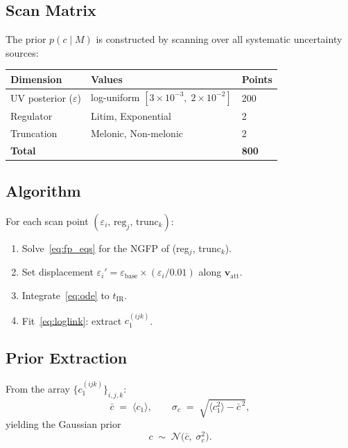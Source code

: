 \documentclass[11pt,a4paper]{article}
\theoremstyle{definition}
\theoremstyle{plain}
\theoremstyle{remark}
\begin{document}
\subsection{Scan Matrix}

The prior $p(c\!\mid\!M)$ is constructed by scanning over all systematic
uncertainty sources:

\begin{center}
\begin{tabular}{lll}
  \toprule
  \textbf{Dimension} & \textbf{Values} & \textbf{Points} \\
  \midrule
  UV posterior ($\varepsilon$) &
    log-uniform $[3\times10^{-3},\;2\times10^{-2}]$ & 200 \\
  Regulator & Litim, Exponential & 2 \\
  Truncation & Melonic, Non-melonic & 2 \\
  \midrule
  \textbf{Total} & & \textbf{800} \\
  \bottomrule
\end{tabular}
\end{center}

\subsection{Algorithm}

For each scan point $(\varepsilon_i,\,\text{reg}_j,\,\text{trunc}_k)$:
\begin{enumerate}[nosep]
  \item Solve~\eqref{eq:fp_eqs} for the NGFP of (reg$_j$, trunc$_k$).
  \item Set displacement
        $\varepsilon_i'=\varepsilon_{\text{base}}\times(\varepsilon_i/0.01)$
        along $\mathbf{v}_{\text{att}}$.
  \item Integrate~\eqref{eq:ode} to $t_{\text{IR}}$.
  \item Fit~\eqref{eq:loglink}: extract $c_1^{(ijk)}$.
\end{enumerate}

\subsection{Prior Extraction}

From the array $\{c_1^{(ijk)}\}_{i,j,k}$:
\begin{equation}
  \bar{c} \;=\; \langle c_1\rangle, \qquad
  \sigma_c \;=\; \sqrt{\langle c_1^2\rangle - \bar{c}^{\,2}},
  \label{eq:prior}
\end{equation}
yielding the Gaussian prior
\begin{equation}
  \boxed{
    c \;\sim\;\mathcal{N}\bigl(\bar{c},\;\sigma_c^2\bigr).
  }
  \label{eq:prior_gauss}
\end{equation}
\end{document}
